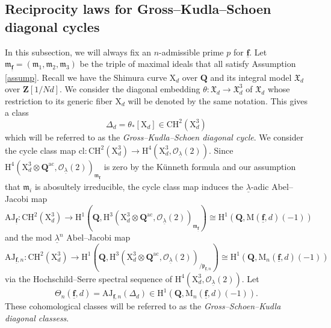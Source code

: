 \documentclass[10pt]{amsart}
\newcommand*\Z{\mathds{Z}}
\newcommand*\ZZ{|[draw,circle]| \Z_2}
\numberwithin{equation}{section}
\theoremstyle{plain}
\numberwithin{equation}{section}
\theoremstyle{definition}
\theoremstyle{remark}
\def\ac{\mathrm{ac}}
\def\frakm{\mathfrak{m}}
\def\interX{\mathfrak{X}}
\def\ac{\mathrm{ac}}
\def\undlamb{\underline{\lambda}}
\def\triplef{\underline{\mathbf{f}}}
\def\calO{\mathcal{O}}
\def\frakm{\mathfrak{m}}
\def\frakp{\mathfrak{p}}
\def\QQ{\mathbf{Q}}
\def\ZZ{\mathbf{Z}}
\def\rmH{\mathrm{H}}
\def\rmM{\mathrm{M}}
\def\rmX{\mathrm{X}}
\begin{document}
\subsection{Reciprocity laws for Gross--Kudla--Schoen diagonal cycles} In this subsection, we will always fix an $n$-admissible prime $p$ for $\triplef$. Let $\frakm_{\triplef}=(\frakm_{1}, \frakm_{2}, \frakm_{3})$ be the triple of maximal ideals that all satisfy Assumption \ref{assump}. Recall we have the Shimura curve $\rmX_{d}$ over $\QQ$ and its integral model $\interX_{d}$ over $\ZZ[1/Nd]$. We consider the diagonal embedding  $\theta: \interX_{d}\rightarrow \interX^{3}_{d}$ of $\interX_{d}$ whose restriction to its generic fiber $\rmX_{d}$ will be denoted by the same notation. This gives a class 
\begin{equation*}
\Delta_{d}=\theta_{*}[\rmX_{d}]\in \mathrm{CH}^{2}(\rmX^{3}_{d}) 
\end{equation*}
which will be referred to as the \emph{Gross--Kudla--Schoen diagonal cycle}. We consider the cycle class map 
$\mathrm{cl}: \mathrm{CH}^{2}(\rmX^{3}_{d})\rightarrow \rmH^{4}(\rmX^{3}_{d}, \calO_{\undlamb}(2))$.
Since $ \rmH^{4}(\rmX^{3}_{d}\otimes{\QQ^{\ac}}, \calO_{\undlamb}(2))_{\frakm_{\triplef}}$ is zero by the K\"{u}nneth formula and our assumption that $\frakm_{i}$ is abosultely irreducible, the cycle class map induces the $\underline{\lambda}$-adic Abel--Jacobi map
\begin{equation}\label{AJ}
\mathrm{AJ}_{\triplef}: \mathrm{CH}^{2}(\rmX^{3}_{d})\rightarrow \rmH^{1}(\QQ,  \rmH^{3}(\rmX^{3}_{d}\otimes{\QQ^{\ac}}, \calO_{\undlamb}(2))_{\frakm_{\triplef}})\cong \rmH^{1}(\QQ,  \rmM(\triplef, d)(-1))
\end{equation} 
and the mod $\underline{\lambda}^{n}$ Abel--Jacobi map
\begin{equation}\label{AJ-n}
\mathrm{AJ}_{\triplef, n}: \mathrm{CH}^{2}(\rmX^{3}_{d})\rightarrow \rmH^{1}(\QQ,  \rmH^{3}(\rmX^{3}_{d}\otimes{\QQ^{\ac}}, \calO_{\undlamb}(2))_{/\frakp_{\triplef,n}})\cong \rmH^{1}(\QQ,  \rmM_{n}(\triplef, d)(-1))
\end{equation} 
via the Hochschild--Serre spectral sequence of $\rmH^{4}(\rmX^{3}_{d}, \calO_{\undlamb}(2))$. Let 
\begin{equation*}
\Theta_{n}(\triplef,d)=\mathrm{AJ}_{\triplef, n}(\Delta_{d})\in \rmH^{1}(\QQ,  \rmM_{n}(\triplef, d)(-1)).
\end{equation*}
These cohomological classes will be referred to as the \emph{Gross--Schoen--Kudla diagonal classess}. 
\end{document}
